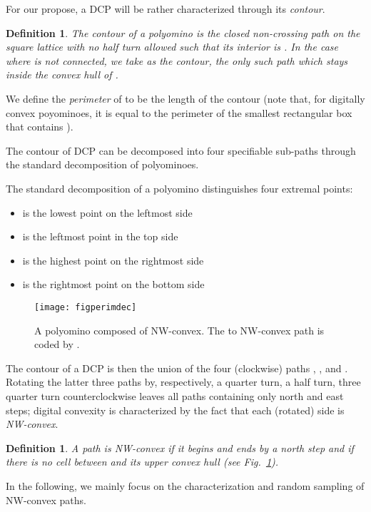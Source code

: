 \documentclass{article}
\newtheorem{definition}[theorem]{Definition}
\begin{document}
For our propose, a DCP will be rather characterized through its \textit{contour}.
\begin{definition}
The \emph{contour} of a polyomino  is the closed non-crossing path on the square lattice with no half turn allowed such that its interior is .
In the case where  is not connected, we take as the contour, the only such path which stays inside the convex hull of .
\end{definition}

We define the \emph{perimeter} of  to be the length of the
contour (note that, for digitally convex poyominoes, it is equal to the perimeter of the
smallest rectangular box that contains ).

The contour of DCP can be decomposed into four specifiable sub-paths through the standard decomposition of polyominoes.



\medskip

The standard decomposition of a polyomino distinguishes four extremal points:
\begin{itemize}
\item{ is the lowest point on the leftmost side}
\item{ is the leftmost point in the top side}
\item{ is the highest point on the rightmost side}
\item{ is the rightmost point on the bottom side}
\end{itemize}
\begin{figure}
\texttt{[image: figperimdec]}
\caption{A polyomino composed of  NW-convex. The  to  NW-convex path is coded by .}
\label{NESW}
\end{figure}

The contour of a DCP is then the union of the four (clockwise) paths
, ,  and . Rotating the latter three paths by,
respectively,
a quarter turn, a half turn, three quarter turn counterclockwise leaves
all paths containing only north and east steps; digital convexity is
characterized by the fact that each (rotated) side is
\emph{NW-convex}.

\begin{definition}
A path  is \emph{NW-convex} if it begins and ends by a north step and
if there is no cell between  and its upper convex hull (see Fig.~\ref{NESW}).
\end{definition}

In the following, we mainly focus on the characterization and random sampling of NW-convex paths.
\end{document}
